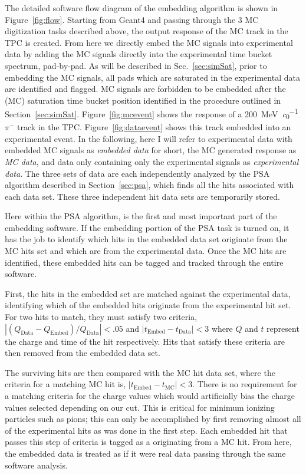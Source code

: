The detailed software flow diagram of the embedding algorithm is shown in Figure~\ref{fig:flow}. Starting from Geant4 and passing through the 3 MC digitization tasks described above, the output response of the MC track in the TPC is created. From here we directly embed the MC signals into experimental data by adding the MC signals directly into the experimental time bucket spectrum, pad-by-pad. As will be described in Sec.~\ref{sec:simSat}, prior to embedding the MC signals, all pads which are saturated in the experimental data are identified and flagged. MC signals are forbidden to be embedded after the (MC) saturation time bucket position identified in the procedure outlined in Section~\ref{sec:simSat}. Figure~\ref{fig:mcevent} shows the response of a \SI{200}{\mega\electronvolt\per\clight} $\pi^-$ track in the TPC. Figure~\ref{fig:dataevent} shows this track embedded into an experimental event. In the following, here I will refer to experimental data with embedded MC signals as \emph{embedded data} for short, the MC generated response as \emph{MC data}, and data only containing only the experimental signals as \emph{experimental data}. The three sets of data are each independently analyzed by the PSA algorithm described in Section~\ref{sec:psa},  which finds all the hits associated with each data set. These three independent hit data sets are temporarily stored. 

Here within the PSA algorithm, is the first and most important part of the embedding software. If the embedding portion of the PSA task is turned on,  it has the job to identify which hits in the embedded data set originate from the MC hits set and which are from the experimental data. Once the MC hits are identified, these embedded hits can be tagged and tracked through the entire software. 

First, the hits in the embedded set are matched against the experimental data, identifying which of the embedded hits originate from the experimental hit set. For two hits to match, they must satisfy two criteria, $\left|(Q_{\mathrm{Data}} - Q_{\mathrm{Embed} })/Q_{\mathrm{Data}}\right| < .05$ and $\left|t_{\mathrm{Embed} } - t_{\mathrm{Data} }\right| < 3$ where $Q$ and $t$ represent the charge and time of the hit respectively. Hits that satisfy these criteria are then removed from the embedded data set.

The surviving hits are then compared with the MC hit data set, where the criteria for a matching MC hit is, $\left|t_{\mathrm{Embed} } - t_{\mathrm{MC} }\right| < 3$.  There is no requirement for a matching criteria for the charge values which would artificially bias the charge values selected depending on our cut. This is critical for minimum ionizing particles such as pions; this can only be accomplished by first removing almost all of the experimental hits as was done in the first step. Each embedded hit that passes this step of criteria is tagged as a originating from a MC hit. From here, the embedded data is treated as if it were real data passing through the same software analysis. 

